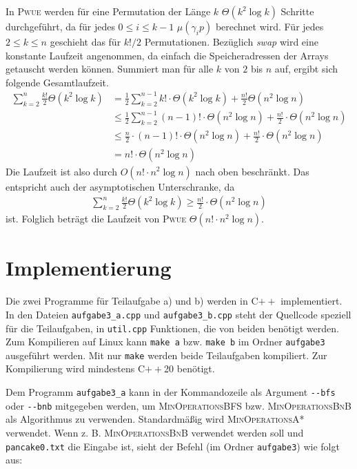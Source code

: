 \documentclass[a4paper, 10pt, ngerman]{article}
\begin{document}
In \textsc{Pwue} werden für eine Permutation der Länge $k$ $\Theta(k^2 \log k)$ Schritte durchgeführt, da für jedes $0 \le i \le k - 1$ $\mu(\gamma_i p)$ berechnet wird. Für jedes $2 \le k \le n$ geschieht das für $k! / 2$ Permutationen. Bezüglich \emph{swap} wird eine konstante Laufzeit angenommen, da einfach die Speicheradressen der Arrays getauscht werden können. Summiert man für alle $k$ von $2$ bis $n$ auf, ergibt sich folgende Gesamtlaufzeit.
\begin{align*}
    \sum_{k = 2}^{n} \frac {k!} 2 \Theta(k^2 \log k)
     & = \frac 1 2 \sum_{k = 2}^{n - 1} k! \cdot \Theta(k^2 \log k) + \frac {n!} 2 \Theta(n^2 \log n) \\
     & \le \frac 1 2 \sum_{k = 2}^{n - 1} (n - 1)! \cdot \Theta(n^2 \log n) + \frac {n!} 2 \cdot \Theta(n^2 \log n) \\
     & \le \frac n 2 \cdot (n - 1)! \cdot \Theta(n^2 \log n) + \frac{n!} 2 \cdot \Theta(n^2 \log n)                 \\
     & = n! \cdot \Theta(n^2 \log n)
\end{align*}
Die Laufzeit ist also durch $O(n! \cdot n^2 \log n)$ nach oben beschränkt. Das entspricht auch der asymptotischen Unterschranke, da
\begin{align*}
    \sum_{k = 2}^{n} \frac {k!} 2 \Theta(k^2 \log k)
    \ge \frac {n!} 2 \cdot \Theta(n^2 \log n)
\end{align*}
ist. Folglich beträgt die Laufzeit von \textsc{Pwue} $\Theta(n! \cdot n^2 \log n)$.

\section{Implementierung}

Die zwei Programme für Teilaufgabe a) und b) werden in C$++$ implementiert. In den Dateien \verb|aufgabe3_a.cpp| und \verb|aufgabe3_b.cpp| steht der Quellcode speziell für die Teilaufgaben, in \verb|util.cpp| Funktionen, die von beiden benötigt werden. Zum Kompilieren auf Linux kann \verb|make a| bzw. \verb|make b| im Ordner \verb|aufgabe3| ausgeführt werden. Mit nur \verb|make| werden beide Teilaufgaben kompiliert. Zur Kompilierung wird mindestens C$++$20 benötigt. 

Dem Programm \verb|aufgabe3_a| kann in der Kommandozeile als Argument \verb|--bfs| oder \verb|--bnb| mitgegeben werden, um \textsc{MinOperationsBFS} bzw. \textsc{MinOperationsBnB} als Algorithmus zu verwenden. Standardmäßig wird \textsc{MinOperationsA*} verwendet. Wenn z. B. \textsc{MinOperationsBnB} verwendet werden soll und \verb|pancake0.txt| die Eingabe ist, sieht der Befehl (im Ordner \verb|aufgabe3|) wie folgt aus:
\end{document}
